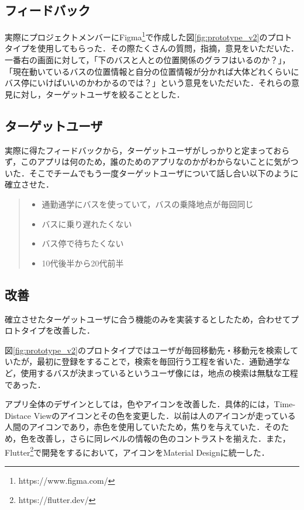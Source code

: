 \subsection{フィードバック}
実際にプロジェクトメンバーにFigma\footnote{https://www.figma.com/}で作成した図\ref{fig:prototype_v2}のプロトタイプを使用してもらった．その際たくさんの質問，指摘，意見をいただいた．一番右の画面に対して，「下のバスと人との位置関係のグラフはいるのか？」，「現在動いているバスの位置情報と自分の位置情報が分かれば大体どれくらいにバス停にいけばいいのかわかるのでは？」という意見をいただいた．それらの意見に対し，ターゲットユーザを絞ることとした．

\subsection{ターゲットユーザ}
実際に得たフィードバックから，ターゲットユーザがしっかりと定まっておらず，このアプリは何のため，誰のためのアプリなのかがわからないことに気がついた．そこでチームでもう一度ターゲットユーザについて話し合い以下のように確立させた．

\begin{quote}
    \begin{itemize}
        \item 通勤通学にバスを使っていて，バスの乗降地点が毎回同じ
        \item バスに乗り遅れたくない
        \item バス停で待ちたくない
        \item 10代後半から20代前半
    \end{itemize}
\end{quote}

\subsection{改善}
確立させたターゲットユーザに合う機能のみを実装するとしたため，合わせてプロトタイプを改善した．

図\ref{fig:prototype_v2}のプロトタイプではユーザが毎回移動先・移動元を検索していたが，最初に登録をすることで，検索を毎回行う工程を省いた．通勤通学など，使用するバスが決まっているというユーザ像には，地点の検索は無駄な工程であった．

アプリ全体のデザインとしては，色やアイコンを改善した．具体的には，Time-Distace Viewのアイコンとその色を変更した．以前は人のアイコンが走っている人間のアイコンであり，赤色を使用していたため，焦りを与えていた．そのため，色を改善し，さらに同レベルの情報の色のコントラストを揃えた．また，Flutter\footnote{https://flutter.dev/}で開発をするにおいて，アイコンをMaterial Designに統一した．

